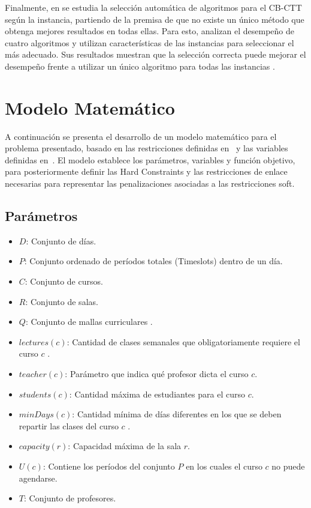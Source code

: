 \documentclass[letter, 10pt]{article}
\begin{document}
Finalmente, en \cite{DeCoster2022AlgorithmSelection} se estudia la selecci\'on autom\'atica de algoritmos para el CB-CTT seg\'un la instancia, partiendo de la premisa de que no existe un \'unico m\'etodo que obtenga mejores resultados en todas ellas. Para esto, analizan el desempe\~no de cuatro algoritmos y utilizan caracter\'isticas de las instancias para seleccionar el m\'as adecuado. Sus resultados muestran que la selecci\'on correcta puede mejorar el desempe\~no frente a utilizar un \'unico algoritmo para todas las instancias \cite{DeCoster2022AlgorithmSelection}.

\section{Modelo Matem\'atico}
A continuaci\'on se presenta el desarrollo de un modelo matem\'atico para el problema presentado, basado en las restricciones definidas en~\cite{DiGaspero2007ITC} y las variables definidas en~\cite{Hao2011LowerBounds}. El modelo establece los par\'ametros, variables y funci\'on objetivo, para posteriormente definir las Hard Constraints y las restricciones de enlace necesarias para representar las penalizaciones asociadas a las restricciones soft.

\subsection{Par\'ametros}
\begin{itemize}
    \item $D$: Conjunto de d\'ias.
    \item $P$: Conjunto ordenado de per\'iodos totales (Timeslots) dentro de un d\'ia.
    \item $C$: Conjunto de cursos.
    \item $R$: Conjunto de salas.
    \item $Q$: Conjunto de mallas curriculares .
    \item $lectures(c)$: Cantidad de clases semanales que obligatoriamente requiere el curso $c$ .
    \item $teacher(c)$: Par\'ametro que indica qu\'e profesor dicta el curso $c$.
    \item $students(c)$: Cantidad m\'axima de estudiantes para el curso $c$.
    \item $minDays(c)$: Cantidad m\'inima de d\'ias diferentes en los que se deben repartir las clases del curso $c$ .
    \item $capacity(r)$: Capacidad m\'axima de la sala $r$.
    \item $U(c)$: Contiene los per\'iodos del conjunto $P$ en los cuales el curso $c$ no puede agendarse.
    \item $T$: Conjunto de profesores.

\end{itemize}
\end{document}

